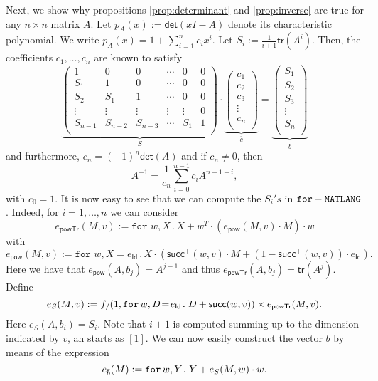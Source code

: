 Next, we show why propositions \ref{prop:determinant}  and \ref{prop:inverse} are true for any $n \times n$ matrix $A$.
Let $p_A(x):=\mathsf{det}(xI-A)$ denote its characteristic polynomial.
We write $p_A(x)=1 + \sum_{i=1}^n c_ix^i$. Let $S_i:=\frac{1}{i+1}\mathsf{tr}(A^i)$. 
Then, the coefficients $c_1,\ldots,c_n$ are known to satisfy 
$$
\underbrace{\left(\begin{matrix}
1 & 0 & 0 & \cdots & 0 & 0\\
S_1 & 1 & 0 & \cdots  &0 & 0\\
S_2 & S_1 & 1 & \cdots  &0 & 0\\
\vdots & \vdots & \vdots & \vdots & \vdots & 0\\
S_{n-1} & S_{n-2} & S_{n-3} & \cdots & S_1 & 1\\
\end{matrix}\right)}_{S}\cdot
\underbrace{\left(\begin{matrix}
c_1\\
c_2\\
c_3\\
\vdots\\
c_n\\
\end{matrix}\right)}_{\bar c}=\underbrace{\left(\begin{matrix}
S_1\\
S_2\\
S_3\\
\vdots\\
S_n\\
\end{matrix}\right)}_{\bar b}
$$
and furthermore, $c_n=(-1)^n\mathsf{det}(A)$ and if $c_{n}\neq 0$, then
$$
A^{-1}=\frac{1}{c_n}\sum_{i=0}^{n-1}c_i A^{n-1-i},
$$
with $c_0=1$. It is now easy to see that we can compute the $S_i's$ in $\langfor$. Indeed, for
$i=1,\ldots,n$ we can consider
$$
e_{\mathsf{powTr}}(M,v):=\texttt{for } w,X\,.\,X+ w^T\cdot\left(e_{\mathsf{pow}}(M,v)\cdot M\right)\cdot w
$$
with 
$$
e_{\mathsf{pow}}(M,v):=\texttt{for } w,X=e_{\mathsf{Id}}\,.\, X\cdot(\mathsf{succ}^+(w,v)\cdot M+(1-\mathsf{succ}^+(w,v))\cdot e_{\mathsf{Id}}).
$$
Here we have that $e_{\mathsf{pow}}(A,b_j)=A^{j-1}$ and thus $e_{\mathsf{powTr}}(A,b_j)=\mathsf{tr}(A^j)$. Define 
$$
e_{S}(M,v):=f_{/}(1, \initf{e_{\mathsf{Id}}}{w}{D}{D+\mathsf{succ}(w,v)})\times e_{\mathsf{powTr}}(M,v).
$$
Here $e_{S}(A,b_i)=S_i$. Note that $i+1$ is computed summing up to the dimension indicated by $v$, an starts as $[1]$.
We can now easily construct the vector $\bar b$ by means of the expression
$$
e_{\bar b}(M):=\ffor{w}{Y}{Y+e_{S}(M,w)\cdot w}.
$$
